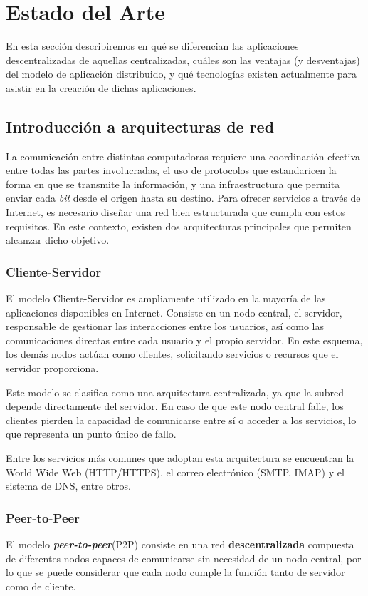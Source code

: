 \section{Estado del Arte}
En esta sección describiremos en qué se diferencian las aplicaciones descentralizadas de aquellas centralizadas, cuáles son las ventajas (y desventajas) del modelo de aplicación distribuido, y qué tecnologías existen actualmente para asistir en la creación de dichas aplicaciones.

\subsection{Introducción a arquitecturas de red}
La comunicación entre distintas computadoras requiere una coordinación efectiva entre todas las partes involucradas, el uso de protocolos que estandaricen la forma en que se transmite la información, y una infraestructura que permita enviar cada \textit{bit} desde el origen hasta su destino. Para ofrecer servicios a través de Internet, es necesario diseñar una red bien estructurada que cumpla con estos requisitos. En este contexto, existen dos arquitecturas principales que permiten alcanzar dicho objetivo.

\subsubsection*{Cliente-Servidor}
El modelo Cliente-Servidor es ampliamente utilizado en la mayoría de las aplicaciones disponibles en Internet. Consiste en un nodo central, el servidor, responsable de gestionar las interacciones entre los usuarios, así como las comunicaciones directas entre cada usuario y el propio servidor. En este esquema, los demás nodos actúan como clientes, solicitando servicios o recursos que el servidor proporciona.

Este modelo se clasifica como una arquitectura centralizada, ya que la subred depende directamente del servidor. En caso de que este nodo central falle, los clientes pierden la capacidad de comunicarse entre sí o acceder a los servicios, lo que representa un punto único de fallo.

Entre los servicios más comunes que adoptan esta arquitectura se encuentran la World Wide Web (HTTP/HTTPS), el correo electrónico (SMTP, IMAP) y el sistema de DNS, entre otros.

\subsubsection*{Peer-to-Peer}
El modelo \textit{\textbf{peer-to-peer}}(P2P) consiste en una red \textbf{descentralizada} compuesta de diferentes nodos capaces de comunicarse sin necesidad de un nodo central, por lo que se puede considerar que cada nodo cumple la función tanto de servidor como de cliente.

